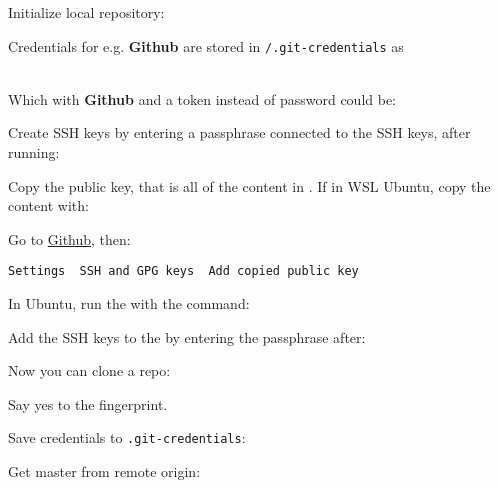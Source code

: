 

Initialize local repository:



Credentials for e.g. \textbf{Github} are stored in \texttt{\textapprox/.git-credentials} as

\\

Which with \textbf{Github} and a token instead of password could be:



Create SSH keys by entering a passphrase connected to the SSH keys, after running:


Copy the public key, that is all of the content in . If in WSL Ubuntu, copy the content with:


Go to \href{www.github.com}{Github}, then:

\texttt{Settings \textrightarrow\ SSH and GPG keys \textrightarrow\ Add copied public key}

In Ubuntu, run the  with the command:


Add the SSH keys to the  by entering the passphrase after:


Now you can clone a repo:


Say yes to the fingerprint.



Save credentials to \texttt{.git-credentials}:


Get master from remote origin:

